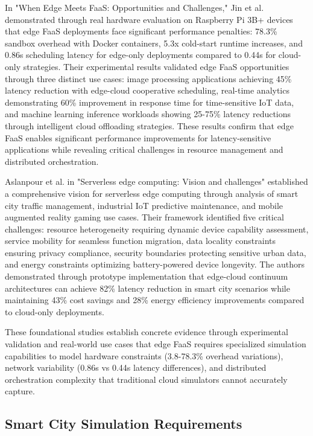In "When Edge Meets FaaS: Opportunities and Challenges," Jin et al. \cite{jin2019when} demonstrated through real hardware evaluation on Raspberry Pi 3B+ devices that edge FaaS deployments face significant performance penalties: 78.3\% sandbox overhead with Docker containers, 5.3x cold-start runtime increases, and 0.86s scheduling latency for edge-only deployments compared to 0.44s for cloud-only strategies. Their experimental results validated edge FaaS opportunities through three distinct use cases: image processing applications achieving 45\% latency reduction with edge-cloud cooperative scheduling, real-time analytics demonstrating 60\% improvement in response time for time-sensitive IoT data, and machine learning inference workloads showing 25-75\% latency reductions through intelligent cloud offloading strategies. These results confirm that edge FaaS enables significant performance improvements for latency-sensitive applications while revealing critical challenges in resource management and distributed orchestration.

Aslanpour et al. \cite{aslanpour2021serverless} in "Serverless edge computing: Vision and challenges" established a comprehensive vision for serverless edge computing through analysis of smart city traffic management, industrial IoT predictive maintenance, and mobile augmented reality gaming use cases. Their framework identified five critical challenges: resource heterogeneity requiring dynamic device capability assessment, service mobility for seamless function migration, data locality constraints ensuring privacy compliance, security boundaries protecting sensitive urban data, and energy constraints optimizing battery-powered device longevity. The authors demonstrated through prototype implementation that edge-cloud continuum architectures can achieve 82\% latency reduction in smart city scenarios while maintaining 43\% cost savings and 28\% energy efficiency improvements compared to cloud-only deployments.

These foundational studies establish concrete evidence through experimental validation and real-world use cases that edge FaaS requires specialized simulation capabilities to model hardware constraints (3.8-78.3\% overhead variations), network variability (0.86s vs 0.44s latency differences), and distributed orchestration complexity that traditional cloud simulators cannot accurately capture.

\subsection{Smart City Simulation Requirements}

